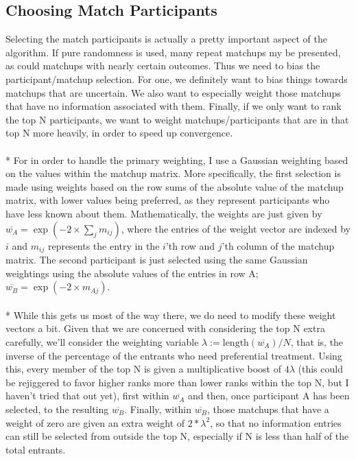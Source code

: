 \documentclass[11pt]{article}
\begin{document}
\subsection{Choosing Match Participants}
\noindent Selecting the match participants is actually a pretty important aspect of the algorithm. If pure randomness is used, many repeat matchups my be presented, as could matchups with nearly certain outcomes. Thus we need to bias the participant/matchup selection. For one, we definitely want to bias things towards matchups that are uncertain. We also want to especially weight those matchups that have no information associated with them. Finally, if we only want to rank the top N participants, we want to weight matchups/participants that are in that top N more heavily, in order to speed up convergence. 
\\
\\*
For in order to handle the primary weighting, I use a Gaussian weighting based on the values within the matchup matrix. More specifically, the first selection is made using weights based on the row sums of the absolute value of the matchup matrix, with lower values being preferred, as they represent participants who have less known about them. Mathematically, the weights are just given by $\overline{w_A} = \exp (-2\times \sum_j m_{ij})$, where the entries of the weight vector are indexed by $i$ and $m_{ij}$ represents the entry in the $i$'th row and $j$'th column of the matchup matrix. The second participant is just selected using the same Gaussian weightings using the absolute values of the entries in row A; $\overline{w_B} = \exp(-2\times m_{Aj})$.
\\
\\*
While this gets us most of the way there, we do need to modify these weight vectors a bit. Given that we are concerned with considering the top N extra carefully, we'll consider the weighting variable $\lambda := \textrm{length}(\overline{w_A})/N$, that is, the inverse of the percentage of the entrants who need preferential treatment. Using this, every member of the top N is given a multiplicative boost of $4\lambda$ (this could be rejiggered to favor higher ranks more than lower ranks within the top N, but I haven't tried that out yet), first within $\overline{w_A}$ and then, once participant A has been selected, to the resulting $\overline{w_B}$. Finally, within $\overline{w_B}$, those matchups that have a weight of zero are given an extra weight of $2*\lambda^2$, so that no information entries can still be selected from outside the top N, especially if N is less than half of the total entrants. 
\end{document}
